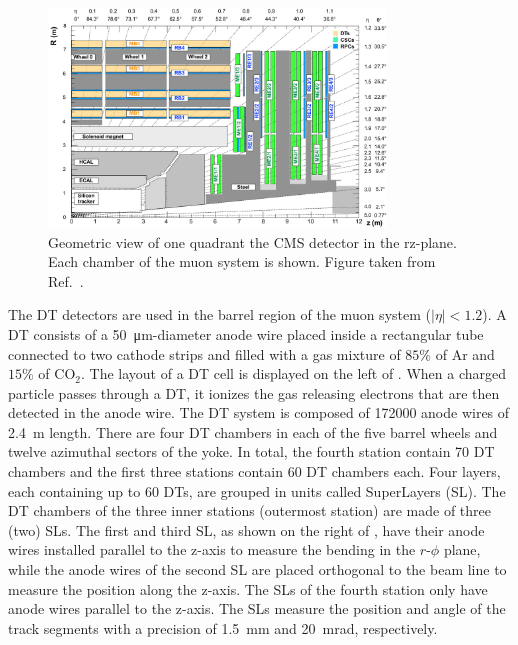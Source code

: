 \begin{figure}[!htbp]
 \begin{center}
  \includegraphics[width=0.8\textwidth]{Figures/Experiment/CMS/MuonSystem.png}
 \end{center}
 \caption{Geometric view of one quadrant the CMS detector in the rz-plane. Each chamber of the muon system is shown. Figure taken from Ref.~\cite{CMSMuonFig}.}
 \label{fig:CMS_Muon}
\end{figure}

The DT detectors are used in the barrel region of the muon system ($|\eta| < 1.2$). A DT consists of a \SI{50}{\um}-diameter anode wire placed inside a rectangular tube connected to two cathode strips and filled with a gas mixture of $85\%$ of Ar and $15\%$ of $\mathrm{CO}_{2}$. The layout of a DT cell is displayed on the left of . When a charged particle passes through a DT, it ionizes the gas releasing electrons that are then detected in the anode wire. The DT system is composed of 172000 anode wires of \SI{2.4}{\m} length. There are four DT chambers in each of the five barrel wheels and twelve azimuthal sectors of the yoke. In total, the fourth station contain 70 DT chambers and the first three stations contain 60 DT chambers each. Four layers, each containing up to 60 DTs, are grouped in units called SuperLayers (SL). The DT chambers of the three inner stations (outermost station) are made of three (two) SLs. The first and third SL, as shown on the right of , have their anode wires installed parallel to the z-axis to measure the bending in the $r$-$\phi$ plane, while the anode wires of the second SL are placed orthogonal to the beam line to measure the position along the z-axis. The SLs of the fourth station only have anode wires parallel to the z-axis. The SLs measure the position and angle of the track segments with a precision of \SI{1.5}{\mm} and \SI{20}{\milli\radian}, respectively.

